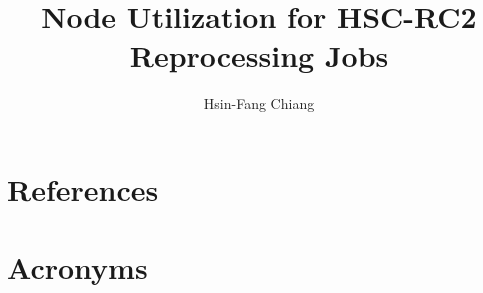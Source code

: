 \documentclass[DM,authoryear,toc]{lsstdoc}
\title{Node Utilization for HSC-RC2 Reprocessing Jobs}
\author{%
Hsin-Fang Chiang
}
\date{\vcsDate}
\begin{document}
\maketitle



\appendix
\section{References} \label{sec:bib}
\renewcommand{\refname}{} %


\section{Acronyms} \label{sec:acronyms}

\end{document}
